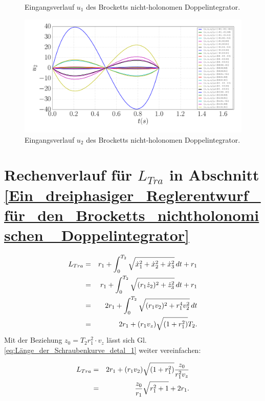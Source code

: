 \begin{appendices}
\begin{figure}[!h]
		\caption{Eingangsverlauf $u_{1}$ des Brocketts nicht-holonomen Doppelintegrator.}
		\label{fig:Eingangsverlauf_u1}
	\end{figure}

	\begin{figure}[!h]
		\centering
		\includegraphics[width=\linewidth]{bild/30_32/u2.pdf}
		\caption{Eingangsverlauf $u_{2}$ des Brocketts nicht-holonomen Doppelintegrator.}
		\label{fig:Eingangsverlauf_u2}
	\end{figure}
\section{Rechenverlauf für $L_{Tra}$ in Abschnitt \ref{Ein_dreiphasiger_Reglerentwurf_für_den_Brocketts_nichtholonomischen_ Doppelintegrator}}
\label{Rechenverlauf_fuer_L_Tra}

\begin{eqnarray}
L_{Tra} &=& r_1 + \int_{0}^{T_{2}} \sqrt{\dot x_1^2 + \dot x_2^2 + \dot x_3^2 }\, dt + r_1 \notag\\&=& r_1 + \int_{0}^{T_{2}} \sqrt{(r_1 \dot z_2)^2 + \dot z_3^2 }\, dt + r_1 \notag\\&=& 2 r_1 + \int_{0}^{T_{2}} \sqrt{  (r_1 v_2)^2 + r_1^4 v_2^2}\, dt \notag\\&=& 2 r_1 + (r_1 v_z)\sqrt{( 1+ r_1^2)}{T_{2}}.
\label{eq:Länge_der_Schraubenkurve_detal_1}
\end{eqnarray} 
Mit der Beziehung $z_{0} = T_{2}r_{1}^{2}\cdot v_{z}$ lässt sich Gl. \ref{eq:Länge_der_Schraubenkurve_detal_1} weiter vereinfachen:

\begin{eqnarray}
L_{Tra} &=& 2 r_1 + (r_1 v_2)\sqrt{( 1+ r_1^2)} \frac{z_{0}}{r_{1}^{2}v_{z}}\notag\\&=&\frac{z_{0}}{r_{1}}\sqrt{r_{1}^{2}+1} + 2r_{1}.
\label{eq:Länge_der_Schraubenkurve_detal_1_kompakt}
\end{eqnarray}


\end{appendices}
